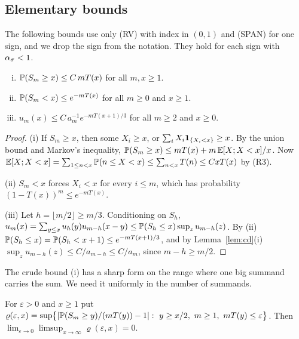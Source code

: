 \subsection{Elementary bounds}\label{sec:elementary}

The following bounds use only (RV) with index in $(0,1)$ and (SPAN) for one sign, and
we drop the sign from the notation. They hold for each sign with $\alpha_\sigma<1$.

\begin{lemma}\label{lem:sums}
\begin{enumerate}[(i)]
\item $\mathbb{P}(S_m\ge x)\le C\,mT(x)$ for all $m,x\ge1$.
\item $\mathbb{P}(S_m<x)\le e^{-mT(x)}$ for all $m\ge0$ and $x\ge1$.
\item $u_m(x)\le C\,a_m^{-1}e^{-mT(x+1)/3}$ for all $m\ge2$ and $x\ge0$.
\end{enumerate}
\end{lemma}

\begin{proof}
(i) If $S_m\ge x$, then some $X_i\ge x$, or $\sum_iX_i\mathbf{1}_{\{X_i<x\}}\ge x$. By the
union bound and Markov's inequality,
$\mathbb{P}(S_m\ge x)\le mT(x)+m\,\mathbb{E}[X;X<x]/x$. Now
$\mathbb{E}[X;X<x]=\sum_{1\le n<x}\mathbb{P}(n\le X<x)\le\sum_{n<x}T(n)\le CxT(x)$ by (R3).

(ii) $S_m<x$ forces $X_i<x$ for every $i\le m$, which has probability
$(1-T(x))^m\le e^{-mT(x)}$.

(iii) Let $h=\lfloor m/2\rfloor\ge m/3$. Conditioning on $S_h$,
$u_m(x)=\sum_{y\le x}u_h(y)u_{m-h}(x-y)\le\mathbb{P}(S_h\le x)\sup_zu_{m-h}(z)$. By (ii)
$\mathbb{P}(S_h\le x)=\mathbb{P}(S_h<x+1)\le e^{-mT(x+1)/3}$, and by Lemma~\ref{lem:cd}(i)
$\sup_zu_{m-h}(z)\le C/a_{m-h}\le C/a_m$, since $m-h\ge m/2$.
\end{proof}

The crude bound (i) has a sharp form on the range where one big summand carries the
sum. We need it uniformly in the number of summands.

\begin{lemma}\label{lem:onejump}
For $\varepsilon>0$ and $x\ge1$ put
$\varrho(\varepsilon,x)=\sup\bigl\{|\mathbb{P}(S_m\ge y)/(mT(y))-1|:\ y\ge x/2,\ m\ge1,\ mT(y)\le\varepsilon\bigr\}$.
Then $\lim_{\varepsilon\to0}\limsup_{x\to\infty}\varrho(\varepsilon,x)=0$.
\end{lemma}

